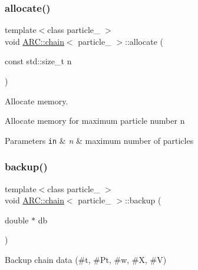 \subsubsection{\texorpdfstring{allocate()}{allocate()}}
{\footnotesize\ttfamily template$<$class particle\+\_\+ $>$ \\
void \hyperlink{classARC_1_1chain}{A\+R\+C\+::chain}$<$ particle\+\_\+ $>$\+::allocate (\begin{DoxyParamCaption}\item[{const std\+::size\+\_\+t}]{n }\end{DoxyParamCaption})\hspace{0.3cm}{\ttfamily [inline]}}



Allocate memory. 

Allocate memory for maximum particle number n 
\begin{DoxyParams}[1]{Parameters}
\mbox{\tt in}  & {\em n} & maximum number of particles \\
\hline
\end{DoxyParams}
\hypertarget{classARC_1_1chain_a3ad5d3a5a2e899ec55bd4aafaa18c2d2}{}\label{classARC_1_1chain_a3ad5d3a5a2e899ec55bd4aafaa18c2d2} 
\subsubsection{\texorpdfstring{backup()}{backup()}}
{\footnotesize\ttfamily template$<$class particle\+\_\+ $>$ \\
void \hyperlink{classARC_1_1chain}{A\+R\+C\+::chain}$<$ particle\+\_\+ $>$\+::backup (\begin{DoxyParamCaption}\item[{double $\ast$}]{db }\end{DoxyParamCaption})\hspace{0.3cm}{\ttfamily [inline]}}



Backup chain data (\#t, \#\+Pt, \#w, \#X, \#V) 

